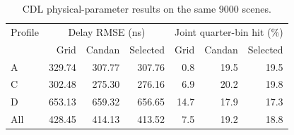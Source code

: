 \begin{table}[!ht]
\centering
\scriptsize
\caption{CDL physical-parameter results on the same 9000 scenes.}
\label{tab:supp_physical}
\begin{tabular}{lrrrrrr}
\toprule
Profile & \multicolumn{3}{c}{Delay RMSE (ns)} & \multicolumn{3}{c}{Joint quarter-bin hit (\%)} \\
 & Grid & Candan & Selected & Grid & Candan & Selected \\
\midrule
A & 329.74 & 307.77 & 307.76 & 0.8 & 19.5 & 19.5 \\
C & 302.48 & 275.30 & 276.16 & 6.9 & 20.2 & 19.8 \\
D & 653.13 & 659.32 & 656.65 & 14.7 & 17.9 & 17.3 \\
All & 428.45 & 414.13 & 413.52 & 7.5 & 19.2 & 18.8 \\
\bottomrule
\end{tabular}
\end{table}
